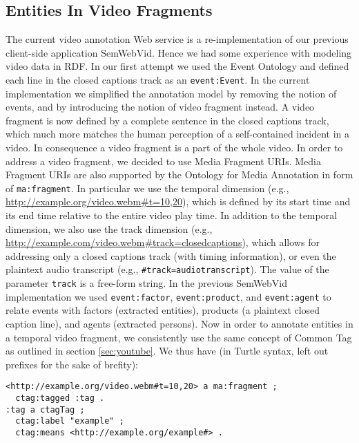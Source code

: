 \documentclass{acm_proc_article-sp}
\begin{document}
\subsection{Entities In Video Fragments}
The current video annotation Web service is a re-implementation of our previous client-side application SemWebVid\cite{Steiner:SemWebVid}. Hence we had some experience with modeling video data in RDF. In our first attempt we used the Event Ontology\cite{Raimond:Event} and defined each line in the closed captions track as an \texttt{event:Event}. In the current implementation we simplified the annotation model by removing the notion of events, and by introducing the notion of video fragment instead. A video fragment is now defined by a complete sentence in the closed captions track, which much more matches the human perception of a self-contained incident in a video. In consequence a video fragment is a part of the whole video. In order to address a video fragment, we decided to use Media Fragment URIs\cite{W3C:MediaFrags}. Media Fragment URIs are also supported by the Ontology for Media Annotation in form of \texttt{ma:fragment}. In particular we use the temporal dimension (e.g., \url{http://example.org/video.webm#t=10,20}), which is defined by its start time and its end time relative to the entire video play time. In addition to the temporal dimension, we also use the track dimension (e.g., \url{http://example.com/video.webm#track=closedcaptions}), which allows for addressing only a closed captions track (with timing information), or even the plaintext audio transcript (e.g., \texttt{\#track=audiotranscript}). The value of the parameter \texttt{track} is a free-form string.
In the previous SemWebVid implementation we used \texttt{event:factor}, \texttt{event:product}, and \texttt{event:agent} to relate events with factors (extracted entities), products (a plaintext closed caption line), and agents (extracted persons). Now in order to annotate entities in a temporal video fragment, we consistently use the same concept of Common Tag as outlined in section \ref{sec:youtube}. We thus have (in Turtle syntax, left out prefixes for the sake of brefity):
\begin{verbatim}
<http://example.org/video.webm#t=10,20> a ma:fragment ;
  ctag:tagged :tag .
:tag a ctagTag ;
  ctag:label "example" ;
  ctag:means <http://example.org/example#> .
\end{verbatim}
\end{document}
